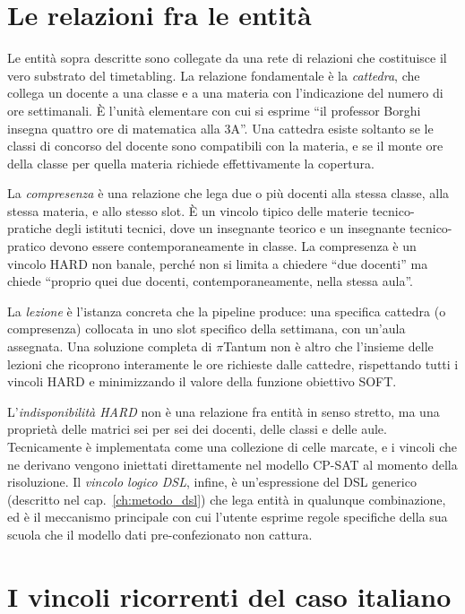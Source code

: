 \section{Le relazioni fra le entit\`a}

Le entit\`a sopra descritte sono collegate da una rete di
relazioni che costituisce il vero substrato del timetabling.
La relazione fondamentale \`e la \emph{cattedra}, che
collega un docente a una classe e a una materia con
l'indicazione del numero di ore settimanali. \`E l'unit\`a
elementare con cui si esprime ``il professor Borghi insegna
quattro ore di matematica alla 3A''. Una cattedra esiste
soltanto se le classi di concorso del docente sono compatibili
con la materia, e se il monte ore della classe per quella
materia richiede effettivamente la copertura.

La \emph{compresenza} \`e una relazione che lega due o pi\`u
docenti alla stessa classe, alla stessa materia, e allo
stesso slot. \`E un vincolo tipico delle materie tecnico-
pratiche degli istituti tecnici, dove un insegnante teorico
e un insegnante tecnico-pratico devono essere
contemporaneamente in classe. La compresenza \`e un vincolo
HARD non banale, perch\'e non si limita a chiedere ``due
docenti'' ma chiede ``proprio quei due docenti, contemporaneamente,
nella stessa aula''.

La \emph{lezione} \`e l'istanza concreta che la pipeline
produce: una specifica cattedra (o compresenza) collocata in
uno slot specifico della settimana, con un'aula assegnata.
Una soluzione completa di $\pi$Tantum non \`e altro che
l'insieme delle lezioni che ricoprono interamente le ore
richieste dalle cattedre, rispettando tutti i vincoli HARD
e minimizzando il valore della funzione obiettivo SOFT.

L'\emph{indisponibilit\`a HARD} non \`e una relazione fra
entit\`a in senso stretto, ma una propriet\`a delle matrici
sei per sei dei docenti, delle classi e delle aule.
Tecnicamente \`e implementata come una collezione di celle
marcate, e i vincoli che ne derivano vengono iniettati
direttamente nel modello CP-SAT al momento della
risoluzione. Il \emph{vincolo logico DSL}, infine, \`e
un'espressione del DSL generico (descritto nel
cap.~\ref{ch:metodo_dsl}) che lega entit\`a in qualunque
combinazione, ed \`e il meccanismo principale con cui
l'utente esprime regole specifiche della sua scuola che il
modello dati pre-confezionato non cattura.

\section{I vincoli ricorrenti del caso italiano}

